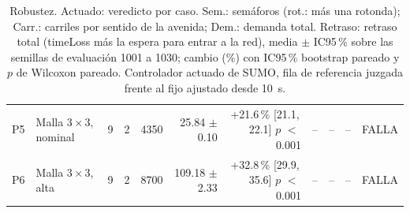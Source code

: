 \begin{table}[H]
\begin{tabular}{llcrrrrrrcl}
P5 & \makecell[l]{Malla $3 \times 3$,\\{}nominal} & 9 & 2 & 4350 & \makecell[r]{25.84\\{}$\pm$ 0.10} & \makecell[r]{+21.6\,\%\\{}[21.1,\,22.1]\\$p$ $<$\,0.001} & -- & -- & -- & FALLA \\
P6 & \makecell[l]{Malla $3 \times 3$,\\{}alta} & 9 & 2 & 8700 & \makecell[r]{109.18\\{}$\pm$ 2.33} & \makecell[r]{+32.8\,\%\\{}[29.9,\,35.6]\\$p$ $<$\,0.001} & -- & -- & -- & FALLA \\
\bottomrule
\end{tabular}
\caption[Robustez: veredicto del actuado]{Robustez. Actuado: veredicto por caso. Sem.: semáforos (rot.: más una rotonda); Carr.: carriles por sentido de la avenida; Dem.: demanda total. Retraso: retraso total (timeLoss más la espera para entrar a la red), media $\pm$ IC95\,\% sobre las semillas de evaluación 1001 a 1030; cambio (\%) con IC95\,\% bootstrap pareado y $p$ de Wilcoxon pareado. Controlador actuado de SUMO, fila de referencia juzgada frente al fijo ajustado desde 10~s.}
\label{tab:robustez-veredicto-actuado}
\end{table}
